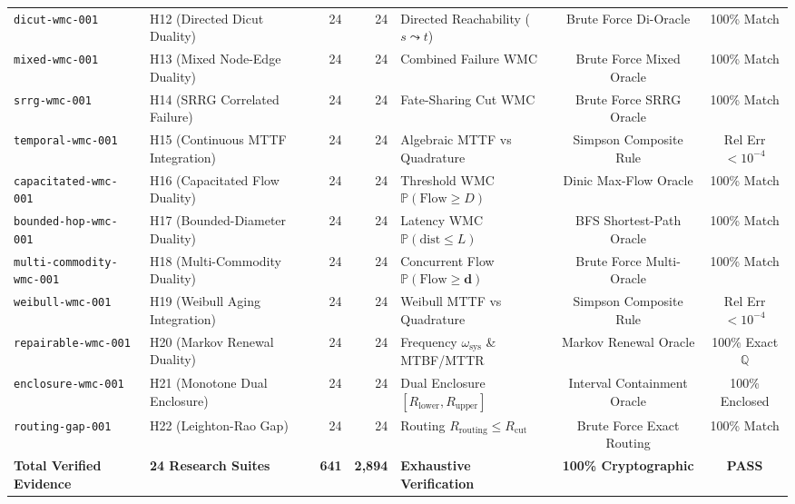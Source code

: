 \documentclass[10pt,journal,compsoc]{IEEEtran}
\begin{document}
\begin{table}[t]
\begin{tabular}{llrrlcc}
\texttt{dicut-wmc-001} & H12 (Directed Dicut Duality) & 24 & 24 & Directed Reachability ($s \leadsto t$) & Brute Force Di-Oracle & 100\% Match \\
\texttt{mixed-wmc-001} & H13 (Mixed Node-Edge Duality) & 24 & 24 & Combined Failure WMC & Brute Force Mixed Oracle & 100\% Match \\
\texttt{srrg-wmc-001} & H14 (SRRG Correlated Failure) & 24 & 24 & Fate-Sharing Cut WMC & Brute Force SRRG Oracle & 100\% Match \\
\texttt{temporal-wmc-001} & H15 (Continuous MTTF Integration) & 24 & 24 & Algebraic MTTF vs Quadrature & Simpson Composite Rule & Rel Err $< 10^{-4}$ \\
\texttt{capacitated-wmc-001} & H16 (Capacitated Flow Duality) & 24 & 24 & Threshold WMC $\mathbb{P}(\text{Flow} \ge D)$ & Dinic Max-Flow Oracle & 100\% Match \\
\texttt{bounded-hop-wmc-001} & H17 (Bounded-Diameter Duality) & 24 & 24 & Latency WMC $\mathbb{P}(\text{dist} \le L)$ & BFS Shortest-Path Oracle & 100\% Match \\
\texttt{multi-commodity-wmc-001} & H18 (Multi-Commodity Duality) & 24 & 24 & Concurrent Flow $\mathbb{P}(\text{Flow} \ge \mathbf{d})$ & Brute Force Multi-Oracle & 100\% Match \\
\texttt{weibull-wmc-001} & H19 (Weibull Aging Integration) & 24 & 24 & Weibull MTTF vs Quadrature & Simpson Composite Rule & Rel Err $< 10^{-4}$ \\
\texttt{repairable-wmc-001} & H20 (Markov Renewal Duality) & 24 & 24 & Frequency $\omega_{\text{sys}}$ \& MTBF/MTTR & Markov Renewal Oracle & 100\% Exact $\mathbb{Q}$ \\
\texttt{enclosure-wmc-001} & H21 (Monotone Dual Enclosure) & 24 & 24 & Dual Enclosure $[R_{\text{lower}}, R_{\text{upper}}]$ & Interval Containment Oracle & 100\% Enclosed \\
\texttt{routing-gap-001} & H22 (Leighton-Rao Gap) & 24 & 24 & Routing $R_{\text{routing}} \le R_{\text{cut}}$ & Brute Force Exact Routing & 100\% Match \\
\midrule
\textbf{Total Verified Evidence} & \textbf{24 Research Suites} & \textbf{641} & \textbf{2,894} & \textbf{Exhaustive Verification} & \textbf{100\% Cryptographic} & \textbf{PASS} \\
\bottomrule
\end{tabular}
\end{table}
\end{document}
